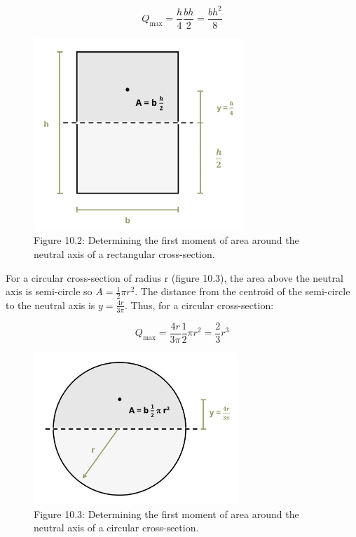 \documentclass[
  letterpaper,
  DIV=11,
  numbers=noendperiod]{scrreprt}
\theoremstyle{definition}
\theoremstyle{remark}
\begin{document}
\[
Q_{\max }=\frac{h}{4} \frac{b h}{2}=\frac{b h^2}{8}
\]

\begin{figure}[H]

{\centering \includegraphics[width=3.125in,height=\textheight]{images/CH10 PNGs/figure 10.2.png}

}

\caption{Figure 10.2: Determining the first moment of area around the
neutral axis of a rectangular cross-section.}

\end{figure}%

For a circular cross-section of radius r (figure 10.3), the area above
the neutral axis is semi-circle so \(A=\frac{1}{2} \pi r^2\). The
distance from the centroid of the semi-circle to the neutral axis is
\(y=\frac{4 r}{3 \pi}\). Thus, for a circular cross-section:

\[
Q_{\max }=\frac{4 r}{3 \pi} \frac{1}{2} \pi r^2=\frac{2}{3} r^3
\]

\begin{figure}[H]

{\centering \includegraphics[width=3.04167in,height=\textheight]{images/CH10 PNGs/figure 10.3.png}

}

\caption{Figure 10.3: Determining the first moment of area around the
neutral axis of a circular cross-section.}

\end{figure}%
\end{document}

